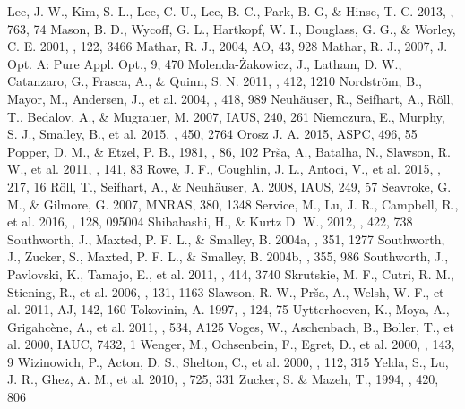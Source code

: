 \documentclass{aa}
\begin{document}
\begin{thebibliography}{}
 Lee, J. W., Kim, S.-L., Lee, C.-U., Lee, B.-C., Park, B.-G, \& Hinse, T. C. 2013, \apj, 763, 74
 Mason, B. D., Wycoff, G. L., Hartkopf, W. I., Douglass, G. G., \& Worley, C. E. 2001, \aj, 122, 3466
 Mathar, R. J., 2004, AO, 43, 928
 Mathar, R. J., 2007, J. Opt. A: Pure Appl. Opt., 9, 470
 Molenda-\.{Z}akowicz, J., Latham, D. W., Catanzaro, G., Frasca, A., \& Quinn, S. N. 2011, \mnras, 412, 1210
 Nordstr\"om, B., Mayor, M., Andersen, J., et al. 2004, \aap, 418, 989 
 Neuh\"auser, R., Seifhart, A., R\"oll, T., Bedalov, A., \& Mugrauer, M. 2007, IAUS, 240, 261
 Niemczura, E., Murphy, S. J., Smalley, B., et al. 2015, \mnras, 450, 2764
 Orosz J. A. 2015, ASPC, 496, 55
 Popper, D. M., \& Etzel, P. B., 1981, \aj, 86, 102
 Pr\v{s}a, A., Batalha, N., Slawson, R. W., et al. 2011, \aj, 141, 83%
 Rowe, J. F., Coughlin, J. L., Antoci, V., et al. 2015, \apjs, 217, 16
 R\"oll, T., Seifhart, A., \& Neuh\"auser, A. 2008, IAUS, 249, 57
 Seavroke, G. M., \& Gilmore, G. 2007, MNRAS, 380, 1348
 Service, M., Lu, J. R., Campbell, R., et al. 2016, \pasp, 128, 095004
 Shibahashi, H., \& Kurtz D. W., 2012, \mnras, 422, 738
 Southworth, J., Maxted, P. F. L., \& Smalley, B. 2004a, \mnras, 351, 1277
 Southworth, J., Zucker, S., Maxted, P. F. L., \& Smalley, B. 2004b, \mnras, 355, 986
 Southworth, J., Pavlovski, K., Tamajo, E., et al. 2011, \mnras, 414, 3740
 Skrutskie, M. F., Cutri, R. M., Stiening, R., et al. 2006, \aj, 131, 1163
 Slawson, R. W., Pr\v{s}a, A., Welsh, W. F., et al. 2011, AJ, 142, 160%
 Tokovinin, A. 1997, \aaps, 124, 75
 Uytterhoeven, K., Moya, A., Grigahc\`{e}ne, A., et al. 2011, \aap, 534, A125
 Voges, W., Aschenbach, B., Boller, T., et al. 2000, IAUC, 7432, 1
 Wenger, M., Ochsenbein, F., Egret, D., et al. 2000, \aap, 143, 9
 Wizinowich, P., Acton, D. S., Shelton, C., et al. 2000, \pasp, 112, 315
 Yelda, S., Lu, J. R., Ghez, A. M., et al. 2010, \apj, 725, 331
 Zucker, S. \& Mazeh, T., 1994, \apj, 420, 806

\end{thebibliography}
\end{document}
